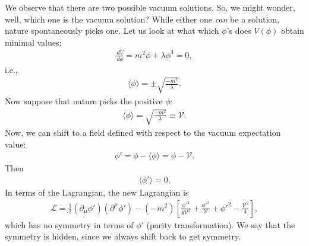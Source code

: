 \documentclass{book}
\numberwithin{equation}{section}
\theoremstyle{definition}
\newcommand{\p}{\partial}
\newcommand{\lag}{\mathcal{L}}
\begin{document}
We observe that there are two possible vacuum solutions. So, we might wonder, well, which one is the vacuum solution? While either one \textit{can} be a solution, nature spontaneously picks one. Let us look at what which $\phi$'s does $V(\phi)$ obtain minimal values:
\begin{align}
\frac{dV}{d\phi} = m^2\phi + \lambda \phi^3 = 0,
\end{align}
i.e.,
\begin{align}
\langle \phi \rangle = \pm \sqrt{\frac{-m^2}{\lambda}}.
\end{align}
Now suppose that nature picks the positive $\phi$:
\begin{align}
\langle \phi \rangle = \sqrt{\frac{-m^2}{\lambda}} \equiv \mathcal{V}.
\end{align}
Now, we can shift to a field defined with respect to the vacuum expectation value:
\begin{align}
\phi' = \phi - \langle \phi \rangle = \phi - \mathcal{V}.
\end{align}
Then 
\begin{align}
\langle \phi' \rangle = 0.
\end{align}
In terms of the Lagrangian, the new Lagrangian is
\begin{align}
\lag = \frac{1}{2}(\p_\mu\phi')(\p^\mu\phi') - (-m^2)\left[ \frac{\phi'^4}{4\mathcal{V}^2} + \frac{\phi'^3}{\mathcal{V}} + \phi'^2 - \frac{\mathcal{V}^2}{4} \right],
\end{align}
which has no symmetry in terms of $\phi'$ (parity transformation). We say that the symmetry is hidden, since we always shift back to get symmetry.\\
\end{document}
